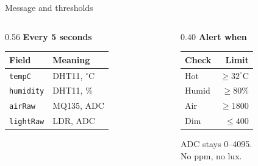\documentclass[pdf]{beamer}
\begin{document}
\begin{frame}{Message and thresholds}
    \begin{columns}[T,onlytextwidth]
        \begin{column}{0.56\textwidth}
            \small
            \textbf{Every 5 seconds}
            \vspace{0.35em}

            \vspace{0.7em}
            \begin{tabular}{@{}ll@{}}
                \toprule
                \textbf{Field} & \textbf{Meaning} \\
                \midrule
                \texttt{tempC} & DHT11, $^\circ$C \\
                \texttt{humidity} & DHT11, \% \\
                \texttt{airRaw} & MQ135, ADC \\
                \texttt{lightRaw} & LDR, ADC \\
                \bottomrule
            \end{tabular}
        \end{column}
        \begin{column}{0.40\textwidth}
            \small
            \textbf{Alert when}
            \vspace{0.8em}

            \begin{tabular}{@{}lr@{}}
                \toprule
                \textbf{Check} & \textbf{Limit} \\
                \midrule
                Hot & $\geq 32^\circ$C \\
                Humid & $\geq 80\%$ \\
                Air & $\geq 1800$ \\
                Dim & $\leq 400$ \\
                \bottomrule
            \end{tabular}

            \vspace{0.8em}
            {\scriptsize ADC stays 0--4095.\\No ppm, no lux.}
        \end{column}
    \end{columns}
\end{frame}
\end{document}
